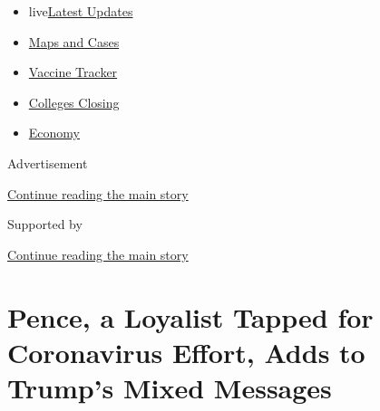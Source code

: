 \begin{itemize}
\tightlist
\item
  live\href{https://www.nytimes3xbfgragh.onion/2020/08/20/world/coronavirus-covid.html?name=styln-coronavirus-national\&region=TOP_BANNER\&variant=undefined\&block=storyline_menu_recirc\&action=click\&pgtype=Article\&impression_id=52e39520-e38a-11ea-85cc-bf105b368d22}{Latest
  Updates}
\item
  \href{https://www.nytimes3xbfgragh.onion/interactive/2020/us/coronavirus-us-cases.html?name=styln-coronavirus-national\&region=TOP_BANNER\&variant=undefined\&block=storyline_menu_recirc\&action=click\&pgtype=Article\&impression_id=52e39521-e38a-11ea-85cc-bf105b368d22}{Maps
  and Cases}
\item
  \href{https://www.nytimes3xbfgragh.onion/interactive/2020/science/coronavirus-vaccine-tracker.html?name=styln-coronavirus-national\&region=TOP_BANNER\&variant=undefined\&block=storyline_menu_recirc\&action=click\&pgtype=Article\&impression_id=52e39522-e38a-11ea-85cc-bf105b368d22}{Vaccine
  Tracker}
\item
  \href{https://www.nytimes3xbfgragh.onion/2020/08/19/us/colleges-closing-covid.html?name=styln-coronavirus-national\&region=TOP_BANNER\&variant=undefined\&block=storyline_menu_recirc\&action=click\&pgtype=Article\&impression_id=52e39523-e38a-11ea-85cc-bf105b368d22}{Colleges
  Closing}
\item
  \href{https://www.nytimes3xbfgragh.onion/live/2020/08/20/business/stock-market-today-coronavirus?name=styln-coronavirus-national\&region=TOP_BANNER\&variant=undefined\&block=storyline_menu_recirc\&action=click\&pgtype=Article\&impression_id=52e3bc30-e38a-11ea-85cc-bf105b368d22}{Economy}
\end{itemize}

Advertisement

\protect\hyperlink{after-top}{Continue reading the main story}

Supported by

\protect\hyperlink{after-sponsor}{Continue reading the main story}

\hypertarget{pence-a-loyalist-tapped-for-coronavirus-effort-adds-to-trumps-mixed-messages}{%
\section{Pence, a Loyalist Tapped for Coronavirus Effort, Adds to
Trump's Mixed
Messages}\label{pence-a-loyalist-tapped-for-coronavirus-effort-adds-to-trumps-mixed-messages}}

